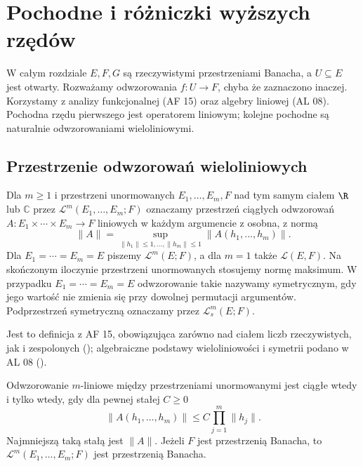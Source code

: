 \chapter{Pochodne i różniczki wyższych rzędów}
\label{ma2:ch:higher-derivatives}

W całym rozdziale $E,F,G$ są rzeczywistymi przestrzeniami
Banacha, a $U\subseteq E$ jest otwarty. Rozważamy odwzorowania
$f:U\to F$, chyba że zaznaczono inaczej. Korzystamy z
analizy funkcjonalnej (AF 15) oraz algebry liniowej (AL 08).
Pochodna rzędu pierwszego jest operatorem liniowym;
kolejne pochodne są naturalnie odwzorowaniami wieloliniowymi.

\section{Przestrzenie odwzorowań wieloliniowych}

\begin{definicja}
\label{ma2:def:multilinear}
Dla $m\ge1$ i przestrzeni unormowanych $E_1,\ldots,E_m,F$
nad tym samym ciałem $\R$ lub $\mathbb C$ przez $\mathcal L^m(E_1,\ldots,E_m;F)$ oznaczamy przestrzeń
ciągłych odwzorowań $A:E_1\times\cdots\times E_m\to F$
liniowych w każdym argumencie z osobna, z normą
\[
 \|A\|=\sup_{\|h_1\|\le1,\ldots,\|h_m\|\le1}
                 \|A(h_1,\ldots,h_m)\|.
\]
Dla $E_1=\cdots=E_m=E$ piszemy $\mathcal L^m(E;F)$,
a dla $m=1$ także $\mathcal L(E,F)$.
Na skończonym iloczynie przestrzeni unormowanych
stosujemy normę maksimum.
W przypadku $E_1=\cdots=E_m=E$ odwzorowanie takie
nazywamy symetrycznym, gdy jego wartość nie zmienia się
przy dowolnej permutacji argumentów.
Podprzestrzeń symetryczną oznaczamy przez $\mathcal L_s^m(E;F)$.
\end{definicja}

Jest to definicja z AF 15, obowiązująca zarówno
nad ciałem liczb rzeczywistych, jak i zespolonych
(); algebraiczne podstawy
wieloliniowości i symetrii podano w AL 08
().

\begin{stwierdzenie}
\label{ma2:prop:multi-banach}
Odwzorowanie $m$-liniowe między przestrzeniami unormowanymi
jest ciągłe wtedy i tylko wtedy, gdy dla pewnej stałej $C\ge0$
\[
 \|A(h_1,\ldots,h_m)\|\le C\prod_{j=1}^m\|h_j\|.
\]
Najmniejszą taką stałą jest $\|A\|$. Jeżeli $F$ jest
przestrzenią Banacha, to $\mathcal L^m(E_1,\ldots,E_m;F)$
jest przestrzenią Banacha.
\end{stwierdzenie}

